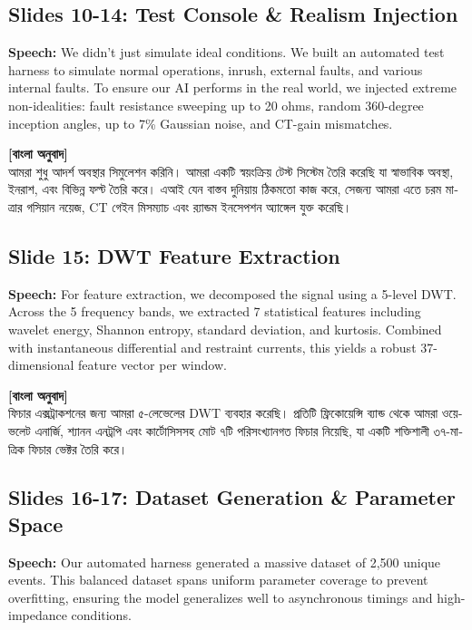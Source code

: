 \documentclass[12pt]{article}
\begin{document}
\subsection*{Slides 10-14: Test Console \& Realism Injection}
\textbf{Speech:} We didn’t just simulate ideal conditions. We built an automated test harness to simulate normal operations, inrush, external faults, and various internal faults. To ensure our AI performs in the real world, we injected extreme non-idealities: fault resistance sweeping up to 20 ohms, random 360-degree inception angles, up to 7\% Gaussian noise, and CT-gain mismatches.

\begin{bengali}
\textbf{[বাংলা অনুবাদ]} \\
আমরা শুধু আদর্শ অবস্থার সিমুলেশন করিনি। আমরা একটি স্বয়ংক্রিয় টেস্ট সিস্টেম তৈরি করেছি যা স্বাভাবিক অবস্থা, ইনরাশ, এবং বিভিন্ন ফল্ট তৈরি করে। এআই যেন বাস্তব দুনিয়ায় ঠিকমতো কাজ করে, সেজন্য আমরা এতে চরম মাত্রার গসিয়ান নয়েজ, CT গেইন মিসম্যাচ এবং র‍্যান্ডম ইনসেপশন অ্যাঙ্গেল যুক্ত করেছি।
\end{bengali}

\subsection*{Slide 15: DWT Feature Extraction}
\textbf{Speech:} For feature extraction, we decomposed the signal using a 5-level DWT. Across the 5 frequency bands, we extracted 7 statistical features including wavelet energy, Shannon entropy, standard deviation, and kurtosis. Combined with instantaneous differential and restraint currents, this yields a robust 37-dimensional feature vector per window.

\begin{bengali}
\textbf{[বাংলা অনুবাদ]} \\
ফিচার এক্সট্রাকশনের জন্য আমরা ৫-লেভেলের DWT ব্যবহার করেছি। প্রতিটি ফ্রিকোয়েন্সি ব্যান্ড থেকে আমরা ওয়েভলেট এনার্জি, শ্যানন এনট্রপি এবং কার্টোসিসসহ মোট ৭টি পরিসংখ্যানগত ফিচার নিয়েছি, যা একটি শক্তিশালী ৩৭-মাত্রিক ফিচার ভেক্টর তৈরি করে।
\end{bengali}

\subsection*{Slides 16-17: Dataset Generation \& Parameter Space}
\textbf{Speech:} Our automated harness generated a massive dataset of 2,500 unique events. This balanced dataset spans uniform parameter coverage to prevent overfitting, ensuring the model generalizes well to asynchronous timings and high-impedance conditions.
\end{document}
